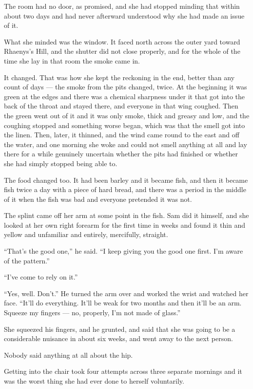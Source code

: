 The room had no door, as promised, and she had stopped minding that within about two days and had never afterward understood why she had made an issue of it.

What she minded was the window. It faced north across the outer yard toward Rhaenys’s Hill, and the shutter did not close properly, and for the whole of the time she lay in that room the smoke came in.

It changed. That was how she kept the reckoning in the end, better than any count of days — the smoke from the pits changed, twice. At the beginning it was green at the edges and there was a chemical sharpness under it that got into the back of the throat and stayed there, and everyone in that wing coughed. Then the green went out of it and it was only smoke, thick and greasy and low, and the coughing stopped and something worse began, which was that the smell got into the linen. Then, later, it thinned, and the wind came round to the east and off the water, and one morning she woke and could not smell anything at all and lay there for a while genuinely uncertain whether the pits had finished or whether she had simply stopped being able to.

The food changed too. It had been barley and it became fish, and then it became fish twice a day with a piece of hard bread, and there was a period in the middle of it when the fish was bad and everyone pretended it was not.

The splint came off her arm at some point in the fish. Sam did it himself, and she looked at her own right forearm for the first time in weeks and found it thin and yellow and unfamiliar and entirely, mercifully, straight.

“That’s the good one,” he said. “I keep giving you the good one first. I’m aware of the pattern.”

“I’ve come to rely on it.”

“Yes, well. Don’t.” He turned the arm over and worked the wrist and watched her face. “It’ll do everything. It’ll be weak for two months and then it’ll be an arm. Squeeze my fingers — no, properly, I’m not made of glass.”

She squeezed his fingers, and he grunted, and said that she was going to be a considerable nuisance in about six weeks, and went away to the next person.

Nobody said anything at all about the hip.

\sceneBreak

Getting into the chair took four attempts across three separate mornings and it was the worst thing she had ever done to herself voluntarily.

